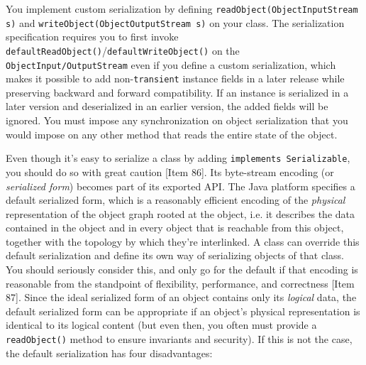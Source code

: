 \documentclass[table, xcdraw]{article}%
\begin{document}
You implement custom serialization by defining \texttt{readObject(ObjectInputStream s)} and \texttt{writeObject(ObjectOutputStream s)} on your class. The serialization specification requires you to first invoke
\texttt{defaultReadObject()}/\texttt{defaultWriteObject()} on the \texttt{ObjectInput/OutputStream} even if you define a custom serialization, which makes it possible to add non-\texttt{transient} instance fields in a later release while preserving backward and forward compatibility. If an instance is serialized in a later version and deserialized in an earlier version, the added fields will be ignored. You must impose any synchronization on object serialization that you would impose on any other method that reads the entire state of the object.

Even though it's easy to serialize a class by adding \texttt{implements Serializable}, you should do so with great caution [Item 86]. Its byte-stream encoding (or \emph{serialized form}) becomes part of its exported API. The Java platform specifies a default serialized form, which is a reasonably efficient encoding of the \emph{physical} representation of the object graph rooted at the object, i.e. it describes the data contained in the object and in every object that is reachable from this object, together with the topology by which they're interlinked. A class can override this default serialization and define its own way of serializing objects of that class. You should seriously consider this, and only go for the default if that encoding is reasonable from the standpoint of flexibility, performance, and correctness [Item 87]. Since the ideal serialized form of an object contains only its \emph{logical} data, the default serialized form can be appropriate if an object’s physical representation is identical to its logical content (but even then, you often must provide a \texttt{readObject()} method to ensure invariants and security). If this is not the case, the default serialization has four disadvantages:
\end{document}
